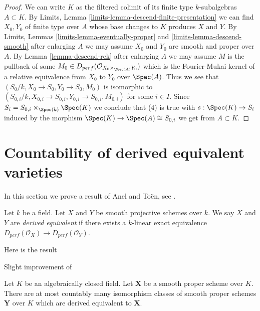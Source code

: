 \begin{proof}
\medskip\noindent
We can write $K$ as the filtered colimit of its finite type
$k$-subalgebras $A \subset K$. By
Limits, Lemma \ref{limits-lemma-descend-finite-presentation}
we can find $X_0, Y_0$ of finite type over $A$ whose
base changes to $K$ produces $X$ and $Y$.
By Limits, Lemmas
\ref{limits-lemma-eventually-proper} and \ref{limits-lemma-descend-smooth}
after enlarging $A$ we may assume $X_0$ and $Y_0$
are smooth and proper over $A$.
By Lemma \ref{lemma-descend-rek}
after enlarging $A$ we may assume $M$ is the pullback of
some $M_0  \in D_{perf}(\mathcal{O}_{X_0 \times_{\Spec(A)} Y_0})$
which is the Fourier-Mukai kernel of a relative equivalence
from $X_0$ to $Y_0$ over $\Spec(A)$.
Thus we see that $(S_0/k, X_0 \to S_0, Y_0 \to S_0, M_0)$
is isomorphic to
$(S_{0, i}/k, X_{0, i} \to S_{0, i}, Y_{0, i} \to S_{0, i}, M_{0, i})$
for some $i \in I$.
Since $S_i = S_{0, i} \times_{\Spec(k)} \Spec(K)$
we conclude that (4) is true with $s : \Spec(K) \to S_i$
induced by the morphism $\Spec(K) \to \Spec(A) \cong S_{0, i}$
we get from $A \subset K$.
\end{proof}








\section{Countability of derived equivalent varieties}
\label{section-countable-derived-equivalent}

\noindent
In this section we prove a result of Anel and To\"en, see \cite{AT}.

\begin{definition}
\label{definition-derived-equivalent}
Let $k$ be a field. Let $X$ and $Y$ be smooth projective schemes over $k$.
We say $X$ and $Y$ are {\it derived equivalent} if there exists a $k$-linear
exact equivalence
$D_{perf}(\mathcal{O}_X) \to D_{perf}(\mathcal{O}_Y)$.
\end{definition}

\noindent
Here is the result

\begin{theorem}
\label{theorem-countable}
\begin{reference}
Slight improvement of \cite{AT}
\end{reference}
Let $K$ be an algebraically closed field. Let $\mathbf{X}$ be a smooth proper
scheme over $K$. There are at most countably many isomorphism classes
of smooth proper schemes $\mathbf{Y}$ over $K$ which are derived
equivalent to $\mathbf{X}$.
\end{theorem}

